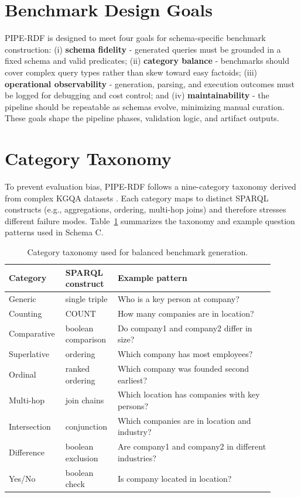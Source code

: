 \documentclass[11pt]{article}
\begin{document}
\section{Benchmark Design Goals}
PIPE-RDF is designed to meet four goals for schema-specific benchmark construction: (i) \textbf{schema fidelity} - generated queries must be grounded in a fixed schema and valid predicates; (ii) \textbf{category balance} - benchmarks should cover complex query types rather than skew toward easy factoids; (iii) \textbf{operational observability} - generation, parsing, and execution outcomes must be logged for debugging and cost control; and (iv) \textbf{maintainability} - the pipeline should be repeatable as schemas evolve, minimizing manual curation. These goals shape the pipeline phases, validation logic, and artifact outputs.

\section{Category Taxonomy}
To prevent evaluation bias, PIPE-RDF follows a nine-category taxonomy derived from complex KGQA datasets \citep{sen2022mintakacomplexnaturalmultilingual}. Each category maps to distinct SPARQL constructs (e.g., aggregations, ordering, multi-hop joins) and therefore stresses different failure modes. Table~\ref{tab:categories} summarizes the taxonomy and example question patterns used in Schema C.

\begin{table}[t]
  \centering
  \scriptsize
  \setlength{\tabcolsep}{3pt}
  \begin{tabular}{>{\raggedright\arraybackslash}p{0.17\linewidth} >{\raggedright\arraybackslash}p{0.16\linewidth} >{\raggedright\arraybackslash}p{0.57\linewidth}}
    \toprule
    Category & SPARQL construct & Example pattern \\
    \midrule
    Generic & single triple & Who is a key person at {company}? \\
    Counting & COUNT & How many companies are in {location}? \\
    Comparative & boolean comparison & Do {company1} and {company2} differ in size? \\
    Superlative & ordering & Which company has most employees? \\
    Ordinal & ranked ordering & Which company was founded second earliest? \\
    Multi-hop & join chains & Which location has companies with key persons? \\
    Intersection & conjunction & Which companies are in {location} and {industry}? \\
    Difference & boolean exclusion & Are {company1} and {company2} in different industries? \\
    Yes/No & boolean check & Is {company} located in {location}? \\
    \bottomrule
  \end{tabular}
  \caption{Category taxonomy used for balanced benchmark generation.}
  \label{tab:categories}
\end{table}
\end{document}
